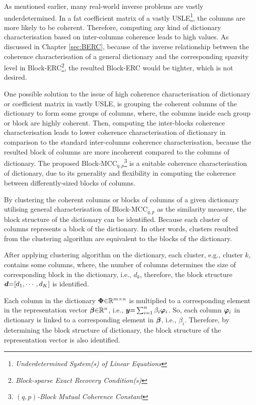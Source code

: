 As mentioned earlier, many real-world inverse problems are vastly underdetermined.
In a fat coefficient matrix of a vastly USLE\footnote{\emph{Underdetermined System(s) of Linear Equations}}, the columns are more likely to be coherent.
Therefore, computing any kind of dictionary characterisation based on inter-columns coherence leads to high values.
As discussed in Chapter \ref{sec:BERC}, because of the inverse relationship between the coherence characterisation of a general dictionary and the corresponding sparsity level in Block-ERC\footnote{\emph{Block-sparse Exact Recovery Condition(s)}}, the resulted Block-ERC would be tighter, which is not desired.

One possible solution to the issue of high coherence characterisation of dictionary or coefficient matrix in vastly USLE, is grouping the coherent columns of the dictionary to form some groups of columns, where, the columns inside each group or block are highly coherent.
Then, computing the inter-blocks coherence characterisation leads to lower coherence characterisation of dictionary in comparison to the standard inter-columns coherence characterisation, because the resulted block of columns are more incoherent compared to the columns of dictionary.
The proposed Block-MCC$_{q,p}$\footnote{\emph{$({q,p})$-Block Mutual Coherence Constant}} is a suitable coherence characterisation of dictionary, due to its generality and flexibility in computing the coherence between differently-sized blocks of columns.

By clustering the coherent columns or blocks of columns of a given dictionary utilising general characterisation of Block-MCC$_{q,p}$ as the similarity measure, the block structure of the dictionary can be identified.
Because each cluster of columns represents a block of the dictionary.
In other words, clusters resulted from the clustering algorithm are equivalent to the blocks of the dictionary.

After applying clustering algorithm on the dictionary, each cluster, e.g., cluster $k$, contains some columns, where, the number of columns determines the size of corresponding block in the dictionary, i.e., $d_k$, therefore, the block structure $\boldsymbol{d} {=} [d_1, \cdots, d_K]$ is identified.

Each column in the dictionary $\boldsymbol{\Phi} {\in} \mathbb{R}^{m {\times} n}$ is multiplied to a corresponding element in the representation vector $\boldsymbol{\beta} {\in} \mathbb{R}^{n}$, i.e., $\boldsymbol{y} {=} \sum_{i=1}^n \beta_i \boldsymbol{\varphi}_i$.
So, each column $\boldsymbol{\varphi}_i$ in dictionary is linked to a corresponding element in $\boldsymbol{\beta}$, i.e., $\beta_i$.
Therefore, by determining the block structure of dictionary, the block structure of the representation vector is also identified.

